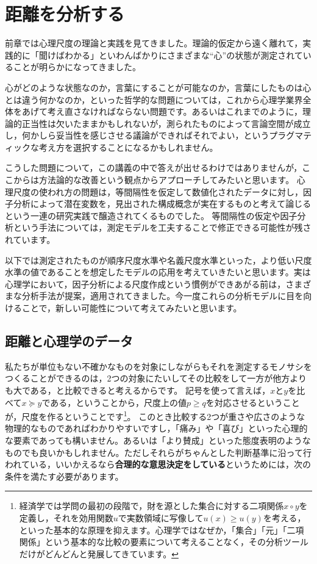 \documentclass{ltjsbook}
\begin{document}
\chapter{距離を分析する}
\label{H07_Distance}

前章では心理尺度の理論と実践を見てきました。理論的仮定から遠く離れて，実践的に「聞けばわかる」といわんばかりにさまざまな``心''の状態が測定されていることが明らかになってきました。

心がどのような状態なのか，言葉にすることが可能なのか，言葉にしたものは心とは違う何かなのか，といった哲学的な問題については，これから心理学業界全体をあげて考え直さなければならない問題です。あるいはこれまでのように，理論的正当性は欠いたままかもしれないが，測られたものによって言論空間が成立し，何かしら妥当性を感じさせる議論ができればそれでよい，というプラグマティックな考え方を選択することになるかもしれません。

こうした問題について，この講義の中で答えが出せるわけではありませんが，ここからは方法論的な改善という観点からアプローチしてみたいと思います。
心理尺度の使われ方の問題は，等間隔性を仮定して数値化されたデータに対し，因子分析によって潜在変数を，見出された構成概念が実在するものと考えて論じるという一連の研究実践で醸造されてくるものでした。
等間隔性の仮定や因子分析という手法については，測定モデルを工夫することで修正できる可能性が残されています。

以下では測定されたものが順序尺度水準や名義尺度水準といった，より低い尺度水準の値であることを想定したモデルの応用を考えていきたいと思います。実は心理学において，因子分析による尺度作成という慣例ができあがる前は，さまざまな分析手法が提案，適用されてきました。今一度これらの分析モデルに目を向けることで，新しい可能性について考えてみたいと思います。

\section{距離と心理学のデータ}
\label{distance}
私たちが単位もない不確かなものを対象にしながらもそれを測定するモノサシをつくることができるのは，2つの対象にたいしてその比較をして一方が他方よりも大である，と比較できると考えるからです。
記号を使って言えば，$x$と$y$を比べて$x \succeq y$である，ということから，尺度上の値$p \ge q$を対応させるということが，尺度を作るということです\footnote{経済学では学問の最初の段階で，財を源とした集合に対する二項関係$x \circ y$を定義し，それを効用関数$u$で実数領域に写像して$u(x) \ge u(y)$を考える，といった基本的な原理を抑えます。心理学ではなぜか，「集合」「元」「二項関係」という基本的な比較の要素について考えることなく，その分析ツールだけがどんどんと発展してきています。}。
このとき比較する2つが重さや広さのような物理的なものであればわかりやすいですし，「痛み」や「喜び」といった心理的な要素であっても構いません。あるいは「より賛成」といった態度表明のようなものでも良いかもしれません。ただしそれらがちゃんとした判断基準に沿って行われている，いいかえるなら\textbf{合理的な意思決定をしている}というためには，次の条件を満たす必要があります。
\end{document}
